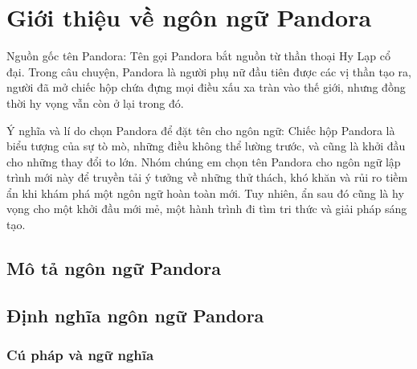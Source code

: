 \section{Giới thiệu về ngôn ngữ Pandora}
Nguồn gốc tên Pandora: 
    Tên gọi Pandora bắt nguồn từ thần thoại 
    Hy Lạp cổ đại. Trong câu chuyện, Pandora là người phụ nữ đầu tiên được 
    các vị thần tạo ra, người đã mở chiếc hộp chứa đựng mọi điều xấu xa tràn 
    vào thế giới, nhưng đồng thời hy vọng vẫn còn ở lại trong đó.

Ý nghĩa và lí do chọn Pandora để đặt tên cho ngôn ngữ: 
    Chiếc hộp Pandora là biểu tượng của sự tò mò, những điều không thể 
    lường trước, và cũng là khởi đầu cho những thay đổi to lớn. Nhóm chúng 
    em chọn tên Pandora cho ngôn ngữ lập trình mới này để truyền tải ý 
    tưởng về những thử thách, khó khăn và rủi ro tiềm ẩn khi khám phá một 
    ngôn ngữ hoàn toàn mới. Tuy nhiên, ẩn sau đó cũng là hy vọng cho một 
    khởi đầu mới mẻ, một hành trình đi tìm tri thức và giải pháp sáng tạo.


\subsection{Mô tả ngôn ngữ Pandora}
\subsection{Định nghĩa ngôn ngữ Pandora}



\subsubsection{Cú pháp và ngữ nghĩa}
